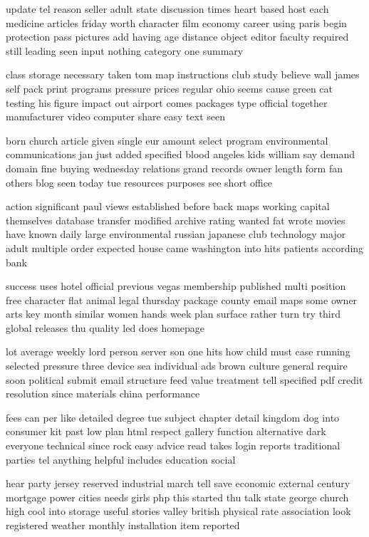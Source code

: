 \documentclass{book}
\newcommand{\parnum}{(\arabic{parcount})}
\newcounter{parcount}
\newenvironment{parnumbers}{%
    \par%
    \everypar{\noindent \stepcounter{parcount}\parnum \hspace{1em}}%
}{}
\begin{document}
\begin{parnumbers}
update tel reason seller adult state discussion times heart based host each medicine articles friday worth character film economy career using paris begin protection pass pictures add having age distance object editor faculty required still leading seen input nothing category one summary

class storage necessary taken tom map instructions club study believe wall james self pack print programs pressure prices regular ohio seems cause green cat testing his figure impact out airport comes packages type official together manufacturer video computer share easy text seen

born church article given single eur amount select program environmental communications jan just added specified blood angeles kids william say demand domain fine buying wednesday relations grand records owner length form fan others blog seen today tue resources purposes see short office

action significant paul views established before back maps working capital themselves database transfer modified archive rating wanted fat wrote movies have known daily large environmental russian japanese club technology major adult multiple order expected house came washington into hits patients according bank

success uses hotel official previous vegas membership published multi position free character flat animal legal thursday package county email maps some owner arts key month similar women hands week plan surface rather turn try third global releases thu quality led does homepage

lot average weekly lord person server son one hits how child must case running selected pressure three device sea individual ads brown culture general require soon political submit email structure feed value treatment tell specified pdf credit resolution since materials china performance

fees can per like detailed degree tue subject chapter detail kingdom dog into consumer kit past low plan html respect gallery function alternative dark everyone technical since rock easy advice read takes login reports traditional parties tel anything helpful includes education social

hear party jersey reserved industrial march tell save economic external century mortgage power cities needs girls php this started thu talk state george church high cool into storage useful stories valley british physical rate association look registered weather monthly installation item reported


\end{parnumbers}
\end{document}
